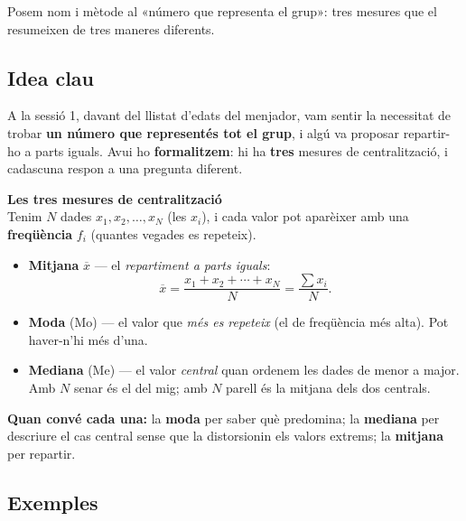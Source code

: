 %
{Posem nom i mètode al «número que representa el grup»: tres mesures que el resumeixen de tres maneres diferents.}

\subsection{Idea clau}

A la sessió 1, davant del llistat d'edats del menjador, vam sentir la necessitat de
trobar \textbf{un número que representés tot el grup}, i algú va proposar repartir-ho
a parts iguals. Avui ho \textbf{formalitzem}: hi ha \textbf{tres} mesures de
centralització, i cadascuna respon a una pregunta diferent.

\begin{idea}
\textbf{Les tres mesures de centralització}\\
Tenim $N$ dades $x_1, x_2, \dots, x_N$ (les $x_i$), i cada valor pot aparèixer amb una
\textbf{freqüència} $f_i$ (quantes vegades es repeteix).
\begin{itemize}[leftmargin=1.4em, itemsep=3pt]
  \item \textbf{Mitjana} $\overline{x}$ — el \emph{repartiment a parts iguals}:
        \[
        \overline{x}=\frac{x_1+x_2+\cdots+x_N}{N}=\frac{\sum x_i}{N}.
        \]
  \item \textbf{Moda} (Mo) — el valor que \emph{més es repeteix} (el de freqüència més
        alta). Pot haver-n'hi més d'una.
  \item \textbf{Mediana} (Me) — el valor \emph{central} quan ordenem les dades de
        menor a major. Amb $N$ senar és el del mig; amb $N$ parell és la mitjana dels
        dos centrals.
\end{itemize}
\textbf{Quan convé cada una:} la \textbf{moda} per saber què predomina; la
\textbf{mediana} per descriure el cas central sense que la distorsionin els valors
extrems; la \textbf{mitjana} per repartir.
\end{idea}

\subsection{Exemples}


